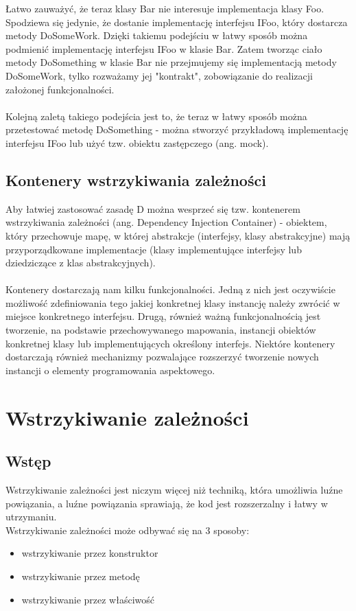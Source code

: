 \documentclass[12pt]{article}
\begin{document}
Łatwo zauważyć, że teraz klasy Bar nie interesuje implementacja klasy Foo. Spodziewa się jedynie, że dostanie implementację interfejsu IFoo, który dostarcza metody DoSomeWork. Dzięki takiemu podejściu w łatwy sposób można podmienić implementację interfejsu IFoo w klasie Bar. Zatem tworząc ciało metody DoSomething w klasie Bar nie przejmujemy się implementacją metody DoSomeWork, tylko rozważamy jej "kontrakt", zobowiązanie do realizacji założonej funkcjonalności.\\
\\
Kolejną zaletą takiego podejścia jest to, że teraz w łatwy sposób można przetestować metodę DoSomething - można stworzyć przykładową implementację interfejsu IFoo lub użyć tzw. obiektu zastępczego (ang. mock).


\subsection{Kontenery wstrzykiwania zależności}
Aby łatwiej zastosować zasadę D można wesprzeć się tzw. kontenerem wstrzykiwania zależności (ang. Dependency Injection Container) - obiektem, który przechowuje mapę, w której abstrakcje (interfejsy, klasy abstrakcyjne) mają przyporządkowane implementacje (klasy implementujące interfejsy lub dziedziczące z klas abstrakcyjnych).\\
\\
Kontenery dostarczają nam kilku funkcjonalności. Jedną z nich jest oczywiście możliwość zdefiniowania tego jakiej konkretnej klasy instancję należy zwrócić w miejsce konkretnego interfejsu. Drugą, również ważną funkcjonalnością jest tworzenie, na podstawie przechowywanego mapowania, instancji obiektów konkretnej klasy lub implementujących określony interfejs. Niektóre kontenery dostarczają również mechanizmy pozwalające rozszerzyć tworzenie nowych instancji o elementy programowania aspektowego.



\clearpage
\section{Wstrzykiwanie zależności}
\subsection{Wstęp}
Wstrzykiwanie zależności jest niczym więcej niż techniką, która umożliwia luźne powiązania, a luźne powiązania sprawiają, że kod jest rozszerzalny i łatwy w utrzymaniu.\cite{dependency_injection}\\
Wstrzykiwanie zależności może odbywać się na 3 sposoby:
\begin{itemize}
	\item wstrzykiwanie przez konstruktor
	\item wstrzykiwanie przez metodę
	\item wstrzykiwanie przez właściwość
\end{itemize}
\end{document}
